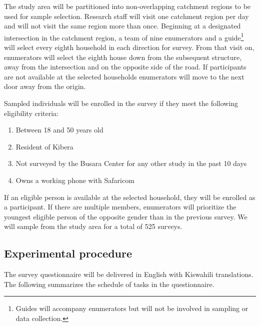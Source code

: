\documentclass[11pt, a4paper]{article}\usepackage[]{graphicx}\usepackage[]{color}
\begin{document}
        The study area will be partitioned into non-overlapping catchment regions to be used for sample selection. Research staff will visit one catchment region per day and will not visit the same region more than once. Beginning at a designated intersection in the catchment region, a team of nine enumerators and a guide\footnote{Guides will accompany enumerators but will not be involved in sampling or data collection.} will select every eighth household in each direction for survey. From that visit on, enumerators will select the eighth house down from the subsequent structure, away from the intersection and on the opposite side of the road. If participants are not available at the selected households enumerators will move to the next door away from the origin.

        Sampled individuals will be enrolled in the survey if they meet the following eligibility criteria:

        \begin{enumerate}
            \item Between 18 and 50 years old
            \item Resident of Kibera
            \item Not surveyed by the Busara Center for any other study in the past 10 days
            \item Owns a working phone with Safaricom
        \end{enumerate}

        If an eligible person is available at the selected household, they will be enrolled as a participant. If there are multiple members, enumerators will prioritize the youngest eligible person of the opposite gender than in the previous survey. We will sample from the study area for a total of 525 surveys.


    \subsection{Experimental procedure}

        The survey questionnaire will be delivered in English with Kiswahili translations. The following summarizes the schedule of tasks in the questionnaire.
\end{document}

